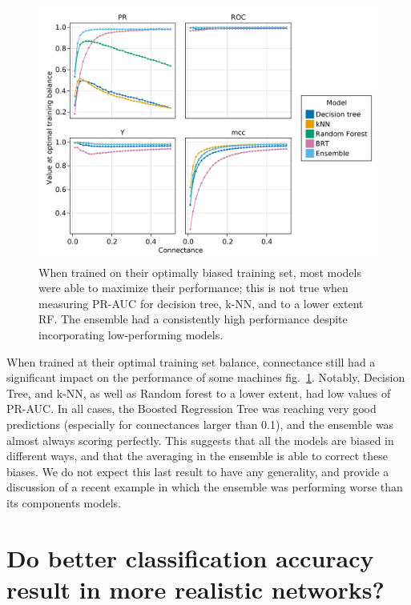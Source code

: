 \documentclass[11pt]{article}
\makeatletter
\def\maxwidth{\ifdim\Gin@nat@width>\linewidth\linewidth
\else\Gin@nat@width\fi}
\let\Oldincludegraphics\includegraphics
\renewcommand{\includegraphics}[1]{\Oldincludegraphics[width=\maxwidth]{#1}}
\makeatother
\begin{document}
\begin{figure}
\hypertarget{fig:optimvalue}{%
\centering
\includegraphics{figures/optimal_value.png}
\caption{When trained on their optimally biased training set, most
models were able to maximize their performance; this is not true when
measuring PR-AUC for decision tree, k-NN, and to a lower extent RF. The
ensemble had a consistently high performance despite incorporating
low-performing models.}\label{fig:optimvalue}
}
\end{figure}

When trained at their optimal training set balance, connectance still
had a significant impact on the performance of some machines
fig.~\ref{fig:optimvalue}. Notably, Decision Tree, and k-NN, as well as
Random forest to a lower extent, had low values of PR-AUC. In all cases,
the Boosted Regression Tree was reaching very good predictions
(especially for connectances larger than 0.1), and the ensemble was
almost always scoring perfectly. This suggests that all the models are
biased in different ways, and that the averaging in the ensemble is able
to correct these biases. We do not expect this last result to have any
generality, and provide a discussion of a recent example in which the
ensemble was performing worse than its components models.

\hypertarget{do-better-classification-accuracy-result-in-more-realistic-networks}{%
\section{Do better classification accuracy result in more realistic
networks?}\label{do-better-classification-accuracy-result-in-more-realistic-networks}}
\end{document}
